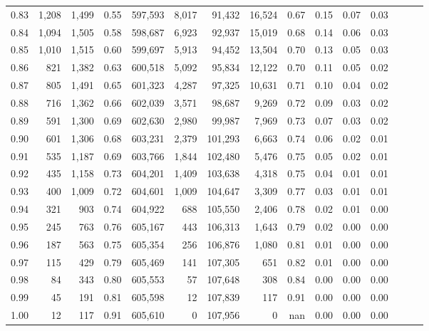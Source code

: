 \begin{tabular}{rrrrrrrrrrrrrrr}
0.83 &   1,208 &  1,499 &  0.55 &  597,593 &    8,017 &   91,432 &   16,524 &  0.67 &  0.15 &  0.07 &      0.03 \\
0.84 &   1,094 &  1,505 &  0.58 &  598,687 &    6,923 &   92,937 &   15,019 &  0.68 &  0.14 &  0.06 &      0.03 \\
0.85 &   1,010 &  1,515 &  0.60 &  599,697 &    5,913 &   94,452 &   13,504 &  0.70 &  0.13 &  0.05 &      0.03 \\
0.86 &     821 &  1,382 &  0.63 &  600,518 &    5,092 &   95,834 &   12,122 &  0.70 &  0.11 &  0.05 &      0.02 \\
0.87 &     805 &  1,491 &  0.65 &  601,323 &    4,287 &   97,325 &   10,631 &  0.71 &  0.10 &  0.04 &      0.02 \\
0.88 &     716 &  1,362 &  0.66 &  602,039 &    3,571 &   98,687 &    9,269 &  0.72 &  0.09 &  0.03 &      0.02 \\
0.89 &     591 &  1,300 &  0.69 &  602,630 &    2,980 &   99,987 &    7,969 &  0.73 &  0.07 &  0.03 &      0.02 \\
0.90 &     601 &  1,306 &  0.68 &  603,231 &    2,379 &  101,293 &    6,663 &  0.74 &  0.06 &  0.02 &      0.01 \\
0.91 &     535 &  1,187 &  0.69 &  603,766 &    1,844 &  102,480 &    5,476 &  0.75 &  0.05 &  0.02 &      0.01 \\
0.92 &     435 &  1,158 &  0.73 &  604,201 &    1,409 &  103,638 &    4,318 &  0.75 &  0.04 &  0.01 &      0.01 \\
0.93 &     400 &  1,009 &  0.72 &  604,601 &    1,009 &  104,647 &    3,309 &  0.77 &  0.03 &  0.01 &      0.01 \\
0.94 &     321 &    903 &  0.74 &  604,922 &      688 &  105,550 &    2,406 &  0.78 &  0.02 &  0.01 &      0.00 \\
0.95 &     245 &    763 &  0.76 &  605,167 &      443 &  106,313 &    1,643 &  0.79 &  0.02 &  0.00 &      0.00 \\
0.96 &     187 &    563 &  0.75 &  605,354 &      256 &  106,876 &    1,080 &  0.81 &  0.01 &  0.00 &      0.00 \\
0.97 &     115 &    429 &  0.79 &  605,469 &      141 &  107,305 &      651 &  0.82 &  0.01 &  0.00 &      0.00 \\
0.98 &      84 &    343 &  0.80 &  605,553 &       57 &  107,648 &      308 &  0.84 &  0.00 &  0.00 &      0.00 \\
0.99 &      45 &    191 &  0.81 &  605,598 &       12 &  107,839 &      117 &  0.91 &  0.00 &  0.00 &      0.00 \\
1.00 &      12 &    117 &  0.91 &  605,610 &        0 &  107,956 &        0 &   nan &  0.00 &  0.00 &      0.00 \\
\bottomrule
\end{tabular}
